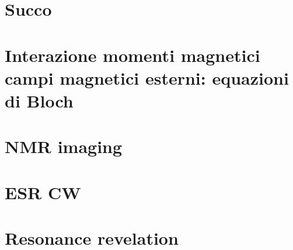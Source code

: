 \documentclass[10pt,xcolor={usenames},fleqn,mathserif,serif]{beamer}
\begin{document}
\part{Succo}


\part{Interazione momenti magnetici campi magnetici esterni: equazioni di Bloch}


\part{NMR imaging}


\part{ESR CW}


\part{Resonance revelation}


%
\end{document}
